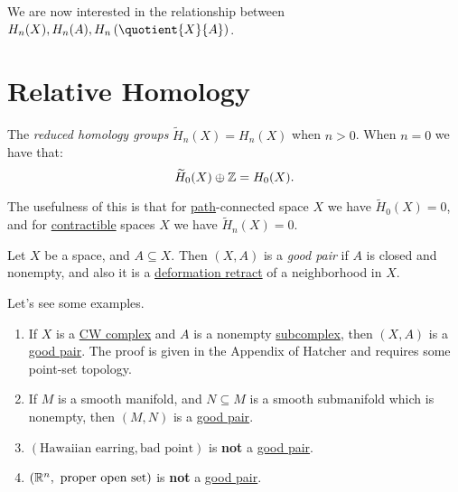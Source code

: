 We are now interested in the relationship between \(H_{n}(X), H_{n} (A), H_{n} \left(\quotient{X}{A}\right)\).

\section{Relative Homology}
\begin{definition}\label{def:reduced-homology-group}
	The \emph{reduced homology groups} \(\widetilde{H}_n(X) = H_n(X)\) when \(n > 0\). When \(n = 0\) we have that:
	\[
		\widetilde{H}_0(X) \oplus \mathbb{\MakeUppercase{z}} = H_0(X).
	\]
\end{definition}
\begin{remark}
	The usefulness of this is that for \hyperref[def:path]{path}-connected space \(X\) we have \(\widetilde{H}_0(X) = 0\), and for
	\hyperref[def:contractible]{contractible} spaces \(X\) we have \(\widetilde{H}_n(X) = 0\).
\end{remark}

\begin{definition}\label{def:good-pair}
	Let \(X\) be a space, and \(A \subseteq X\). Then \((X, A)\) is a \emph{good pair} if \(A\) is closed and nonempty, and also it is a
	\hyperref[def:deformation-retraction]{deformation retract} of a neighborhood in \(X\).
\end{definition}

\begin{eg}
	Let's see some examples.
	\begin{enumerate}
		\item If \(X\) is a \hyperref[def:CW-Complex]{CW complex} and \(A\) is a nonempty \hyperref[def:CW-subcomplex]{subcomplex}, then \((X, A)\)
		      is a \hyperref[def:good-pair]{good pair}. The proof is given in the Appendix of Hatcher\cite{hatcher2002algebraic} and requires some
		      point-set topology.
		\item If \(M\) is a smooth manifold, and \(N\subseteq M\) is a smooth submanifold which is nonempty, then \((M, N)\) is a \hyperref[def:good-pair]{good pair}.
		\item \((\text{Hawaiian earring}, \text{bad point})\) is \textbf{not} a \hyperref[def:good-pair]{good pair}.
		\item \((\mathbb{\MakeUppercase{r}} ^n, \text{ proper open set})\) is \textbf{not} a \hyperref[def:good-pair]{good pair}.
	\end{enumerate}
\end{eg}

